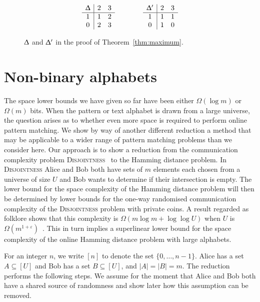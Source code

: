 \documentclass{article}
\renewcommand{\epsilon}{\varepsilon}
\renewcommand{\Delta}{\Updelta}
\newcommand{\disjointness}{\textsc{Disjointness}\xspace}
\theoremstyle{plain}
\theoremstyle{definition}
\begin{document}
\begin{figure}[t]
    \begin{equation*}
        \begin{array}{c|cc}
            \Delta & 2 & 3\\
            \hline 1 & 1 & 2\\
            0 & 2 & 3
        \end{array}
        \qquad \qquad
        \begin{array}{c|cc}
            \Delta' & 2 & 3\\
            \hline 1 & 1 & 1\\
            0 & 1 & 0
        \end{array}
    \end{equation*}
    \caption{\label{fig:infinity}$\Delta$ and $\Delta'$ in the proof of Theorem~\ref{thm:maximum}.}
\end{figure}


\section{Non-binary alphabets}\label{sec:nonbinary}

The space lower bounds we have given so far have been either $\Omega(\log{m})$ or $\Omega(m)$ bits. When the pattern or text alphabet is drawn from a large universe, the question arises as to whether even more space is required to perform online pattern matching.  We show by way of another different reduction a method that may be applicable to a wider range of pattern matching problems than we consider here. Our approach is to show a reduction from  the communication complexity problem \disjointness~\cite{Kushilevitz:97} to the Hamming distance problem.  In \disjointness Alice and Bob both have sets of $m$ elements each chosen from a universe of size $U$ and Bob wants to determine if their intersection is empty. The lower bound for the space complexity of the Hamming distance problem will then be determined by lower bounds for the one-way randomised communication complexity of the \disjointness problem with private coins.  A result regarded as folklore shows that this complexity is $\Omega(m\log{m}+\log{\log{U}})$ when $U$ is  $\Omega(m^{1+\epsilon})$~\cite{Nisan:2011,P-folklore:09}. This in turn implies a superlinear lower bound for the space complexity of the online Hamming distance problem with large alphabets.

For an integer $n$, we write $[n]$ to denote the set $\{0,\dots,n-1\}$. Alice has a set $A\subseteq [U]$ and Bob has a set $B\subseteq [U]$, and $|A|=|B|=m$. The reduction performs the following steps. We assume for the moment that Alice and Bob both have a shared source of randomness and show later how this assumption can be removed.
\end{document}
